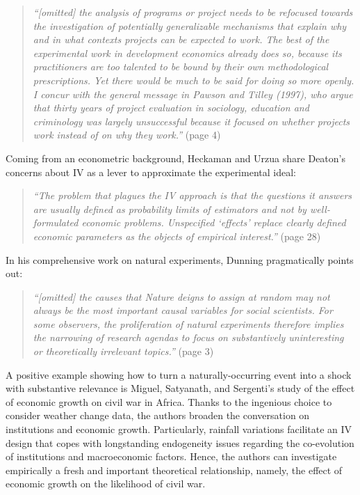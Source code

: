 \begin{refsection}
\begin{quote}
   \textit{
  ``[omitted] the analysis of programs or project needs to be refocused towards
  the investigation of potentially generalizable mechanisms that explain why and
  in what contexts projects can be expected to work. The best of the
  experimental work in development economics already does so, because its
  practitioners are too talented to be bound by their own methodological
  prescriptions. Yet there would be much to be said for doing so more openly. I
  concur with the general message in Pawson and Tilley (1997), who argue that
  thirty years of project evaluation in sociology, education and criminology was
  largely unsuccessful because it focused on whether projects work instead of on
  why they work.''
  }
  (page 4)
\end{quote}

Coming from an econometric background, Heckaman and Urzua
\parencite*{heckman_urzua_2010} share Deaton's concerns about IV as a lever to
approximate the experimental ideal:

\begin{quote}
  \textit{
  ``The problem that plagues the IV approach is that the questions it answers are
  usually defined as probability limits of estimators and not by well-formulated
  economic problems. Unspecified `effects' replace clearly defined economic
  parameters as the objects of empirical interest.''
  }
  (page 28)
\end{quote}

In his comprehensive work on natural experiments, Dunning 
\parencite*{dunning_2012} pragmatically points out:

\begin{quote}
  \textit{
  ``[omitted] the causes that Nature deigns to assign at random may not always be
  the most important causal variables for social scientists. For some observers,
  the proliferation of natural experiments therefore implies the narrowing of
  research agendas to focus on substantively uninteresting or theoretically
  irrelevant topics.''
  }
  (page 3)
\end{quote}

A positive example showing how to turn a naturally-occurring event into a shock
with substantive relevance is Miguel, Satyanath, and Sergenti's
\parencite*{miguel_et_al_2004} study of the effect of economic growth on civil
war in Africa. Thanks to the ingenious choice to consider weather change data,
the authors broaden the conversation on institutions and economic growth.
Particularly, rainfall variations facilitate an IV design that copes with
longstanding endogeneity issues regarding the co-evolution of institutions and
macroeconomic factors. Hence, the authors can investigate empirically a fresh
and important theoretical relationship, namely, the effect of economic growth on
the likelihood of civil war. 


\end{refsection}
